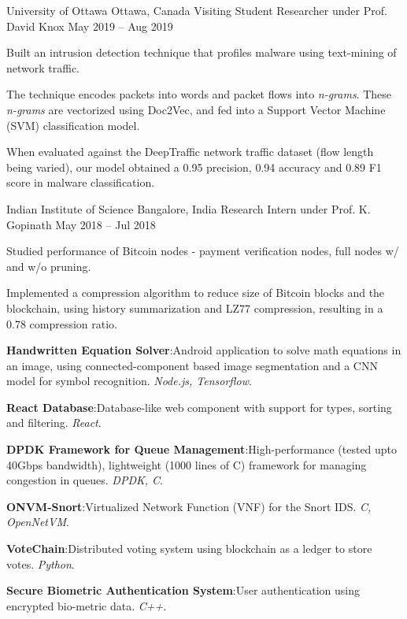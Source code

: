 \documentclass[11pt,a4paper]{article}
\begin{document}
\headedsection
{University of Ottawa}
{Ottawa, Canada}
{Visiting Student Researcher under Prof. David Knox}
{May 2019 -- Aug 2019}{
	\begin{circlist}
		\item Built an intrusion detection technique that profiles malware using text-mining of network traffic.
		\item The technique encodes packets into words and packet flows into \textit{n-grams}. These \textit{n-grams} are vectorized using Doc2Vec, and fed into a Support Vector Machine (SVM) classification model.
		\item When evaluated against the DeepTraffic network traffic dataset (flow length being varied), our model obtained a 0.95 precision, 0.94 accuracy and 0.89 F1 score in malware classification.
	\end{circlist}
}

\headedsection
{Indian Institute of Science}
{Bangalore, India}
{Research Intern under Prof. K. Gopinath}
{May 2018 -- Jul 2018}{
	\begin{circlist}
		\item Studied performance of Bitcoin nodes - payment verification nodes, full nodes w/ and w/o pruning.
		\item Implemented a compression algorithm to reduce size of Bitcoin blocks and the blockchain, using history summarization and LZ77 compression, resulting in a 0.78 compression ratio.
	\end{circlist}
}


\begin{circlist}
	\item \textbf{Handwritten Equation Solver}:\hspace{0.5ex}Android application to solve math equations in an image, using connected-component based image segmentation and a CNN model for symbol recognition. \textit{Node.js, Tensorflow}.
	\item \textbf{React Database}:\hspace{0.5ex}Database-like web component with support for types, sorting and filtering. \textit{React}.
	\item \textbf{DPDK Framework for Queue Management}:\hspace{0.5ex}High-performance (tested upto 40Gbps bandwidth), lightweight (1000 lines of C) framework for managing congestion in queues. \textit{DPDK, C}.
	\item \textbf{ONVM-Snort}:\hspace{0.5ex}Virtualized Network Function (VNF) for the Snort IDS. \textit{C, OpenNetVM}.
	\item \textbf{VoteChain}:\hspace{0.5ex}Distributed voting system using blockchain as a ledger to store votes. \textit{Python}.
	\item \textbf{Secure Biometric Authentication System}:\hspace{0.5ex}User authentication using encrypted bio-metric data. \textit{C++}.
\end{circlist}
\end{document}
